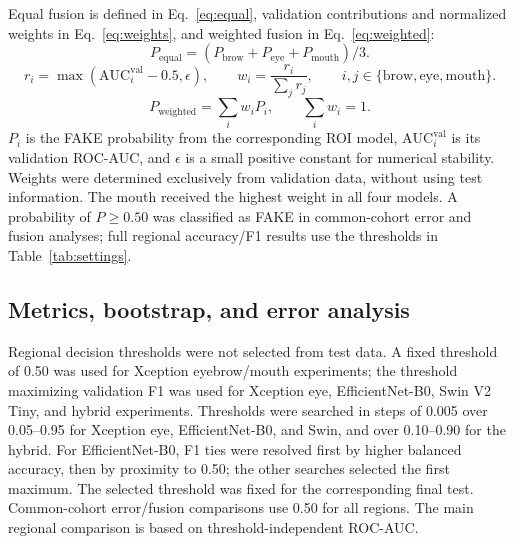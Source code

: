 \documentclass[a4paper]{elektr}
\begin{document}
Equal fusion is defined in Eq.~\eqref{eq:equal}, validation contributions and normalized weights in Eq.~\eqref{eq:weights}, and weighted fusion in Eq.~\eqref{eq:weighted}:
\begin{equation}\label{eq:equal}
P_{\mathrm{equal}}=(P_{\mathrm{brow}}+P_{\mathrm{eye}}+P_{\mathrm{mouth}})/3.
\end{equation}
\begin{equation}\label{eq:weights}
r_i=\max(\mathrm{AUC}^{\mathrm{val}}_i-0.5,\epsilon),\qquad
w_i=\frac{r_i}{\sum_jr_j},\qquad i,j\in\{\mathrm{brow,eye,mouth}\}.
\end{equation}
\begin{equation}\label{eq:weighted}
P_{\mathrm{weighted}}=\sum_iw_iP_i,\qquad\sum_iw_i=1.
\end{equation}
$P_i$ is the FAKE probability from the corresponding ROI model, $\mathrm{AUC}^{\mathrm{val}}_i$ is its validation ROC-AUC, and $\epsilon$ is a small positive constant for numerical stability. Weights were determined exclusively from validation data, without using test information. The mouth received the highest weight in all four models. A probability of $P\geq0.50$ was classified as FAKE in common-cohort error and fusion analyses; full regional accuracy/F1 results use the thresholds in Table~\ref{tab:settings}.

\subsection{Metrics, bootstrap, and error analysis}
Regional decision thresholds were not selected from test data. A fixed threshold of 0.50 was used for Xception eyebrow/mouth experiments; the threshold maximizing validation F1 was used for Xception eye, EfficientNet-B0, Swin V2 Tiny, and hybrid experiments. Thresholds were searched in steps of 0.005 over 0.05--0.95 for Xception eye, EfficientNet-B0, and Swin, and over 0.10--0.90 for the hybrid. For EfficientNet-B0, F1 ties were resolved first by higher balanced accuracy, then by proximity to 0.50; the other searches selected the first maximum. The selected threshold was fixed for the corresponding final test. Common-cohort error/fusion comparisons use 0.50 for all regions. The main regional comparison is based on threshold-independent ROC-AUC.
\end{document}
